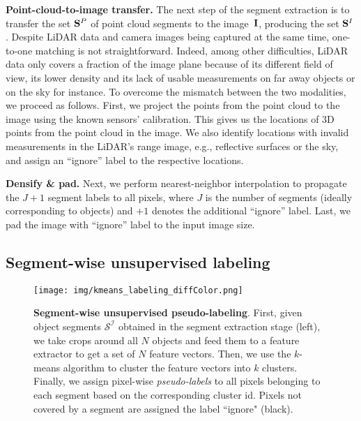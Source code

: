 \documentclass[runningheads]{llncs}
\newcommand{\paragraphcustom}[1]{\smallskip\noindent\textbf{#1}}
\begin{document}
\paragraphcustom{Point-cloud-to-image transfer.} 
The next step of the segment extraction is to transfer the set $\mathbf{S}^P$ of point cloud segments 
to the image~$\mathbf{I}$,
producing the set 
$\mathbf{S}^I$. Despite LiDAR data and camera images being captured at the same time, one-to-one matching is not straightforward. 
Indeed, among other difficulties, LiDAR data only covers a fraction of the image plane because of its different field of view, its lower density and its lack of usable measurements on far away objects or on the sky for instance.
To overcome the mismatch between the two modalities, we proceed as follows.  
First, we project the points from the point cloud to the image using the known sensors' calibration. This gives us the locations of 3D points from the point cloud in the image.  
We also identify locations with invalid measurements in the LiDAR's range image, 
e.g., reflective surfaces or the sky, 
and assign an ``ignore'' label to the respective locations.


\paragraphcustom{Densify \& pad.} 
Next, we perform nearest-neighbor interpolation to propagate the $J+1$ segment labels to all pixels, where $J$ is the number of segments (ideally corresponding to objects) and $+1$ denotes the additional ``ignore'' label. Last, we pad the image with ``ignore'' label to the input image size.

\subsection{Segment-wise unsupervised labeling}
\label{sec:clustering}

\begin{figure}[t]
    \centering
    \texttt{[image: img/kmeans\_labeling\_diffColor.png]}
    \vspace{-5ex}
    \caption{\small 
    \textbf{Segment-wise unsupervised pseudo-labeling}. First, given object segments $\mathcal{S^I}$ obtained in the segment extraction stage (left), we take crops around all $N$ objects and feed them to 
    a
    feature extractor to get a set of $N$ feature vectors. Then, we use the $k$-means algorithm to cluster the feature vectors into $k$ clusters. Finally, we assign pixel-wise {\em pseudo-labels} to all pixels belonging to each segment based on the corresponding cluster id. Pixels not covered by a segment are assigned the label ``ignore" (black).
    }
    
    \label{fig:labeling pipeline}
    \vspace{-3ex}
\end{figure}
\end{document}
